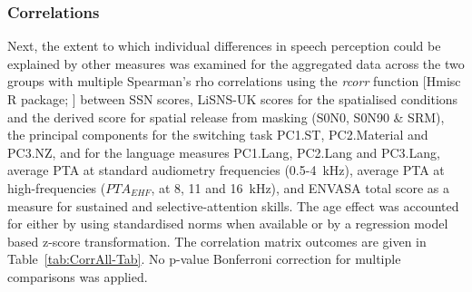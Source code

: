 \documentclass[a4paper, twoside]{templates/ociamthesis}
\begin{document}
\hypertarget{correlations}{%
\subsubsection{Correlations}\label{correlations}}

Next, the extent to which individual differences in speech perception could be explained by other measures was examined for the aggregated data across the two groups with multiple Spearman's rho correlations using the \emph{rcorr} function {[}Hmisc R package; \textcite{HmiscPackageR}{]} between SSN scores, LiSNS-UK scores for the spatialised conditions and the derived score for spatial release from masking (S0N0, S0N90 \& SRM), the principal components for the switching task PC1.ST, PC2.Material and PC3.NZ, and for the language measures PC1.Lang, PC2.Lang and PC3.Lang, average PTA at standard audiometry frequencies (0.5-4~kHz), average PTA at high-frequencies (\(PTA_{EHF}\), at 8, 11 and 16~kHz), and ENVASA total score as a measure for sustained and selective-attention skills. The age effect was accounted for either by using standardised norms when available or by a regression model based z-score transformation. The correlation matrix outcomes are given in Table~\ref{tab:CorrAll-Tab}. No p-value Bonferroni correction for multiple comparisons was applied.\\
\end{document}

